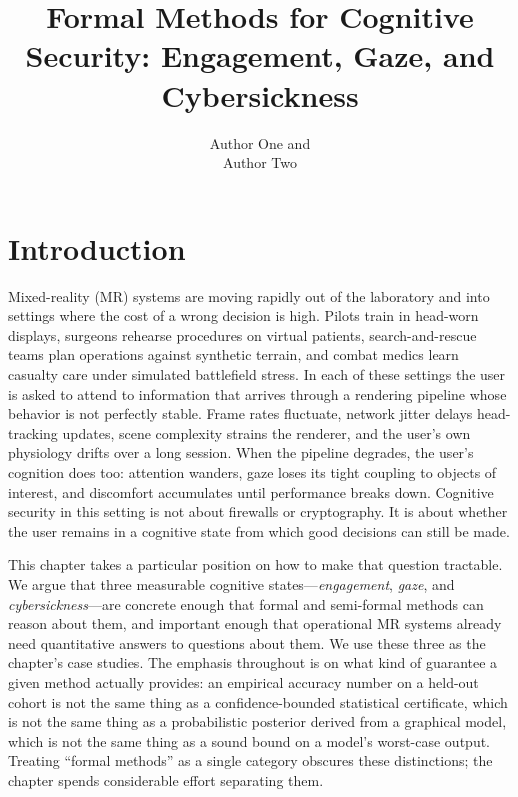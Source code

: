 \documentclass[graybox]{svmult}
\begin{document}
\title*{Formal Methods for Cognitive Security: Engagement, Gaze, and Cybersickness}
\author{Author One and\\ Author Two}


\maketitle

\section{Introduction}
\label{sec:introduction}

Mixed-reality (MR) systems are moving rapidly out of the laboratory and into settings where the cost of a wrong decision is high. Pilots train in head-worn displays, surgeons rehearse procedures on virtual patients, search-and-rescue teams plan operations against synthetic terrain, and combat medics learn casualty care under simulated battlefield stress. In each of these settings the user is asked to attend to information that arrives through a rendering pipeline whose behavior is not perfectly stable. Frame rates fluctuate, network jitter delays head-tracking updates, scene complexity strains the renderer, and the user's own physiology drifts over a long session. When the pipeline degrades, the user's cognition does too: attention wanders, gaze loses its tight coupling to objects of interest, and discomfort accumulates until performance breaks down. Cognitive security in this setting is not about firewalls or cryptography. It is about whether the user remains in a cognitive state from which good decisions can still be made.

This chapter takes a particular position on how to make that question tractable. We argue that three measurable cognitive states---\emph{engagement}, \emph{gaze}, and \emph{cybersickness}---are concrete enough that formal and semi-formal methods can reason about them, and important enough that operational MR systems already need quantitative answers to questions about them. We use these three as the chapter's case studies. The emphasis throughout is on what kind of guarantee a given method actually provides: an empirical accuracy number on a held-out cohort is not the same thing as a confidence-bounded statistical certificate, which is not the same thing as a probabilistic posterior derived from a graphical model, which is not the same thing as a sound bound on a model's worst-case output. Treating ``formal methods'' as a single category obscures these distinctions; the chapter spends considerable effort separating them.
\end{document}

